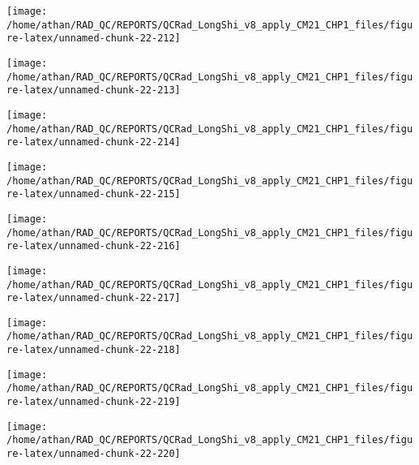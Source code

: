 \documentclass[
  10pt,
  a4paper,oneside]{article}
\begin{document}
\begin{center}\texttt{[image: /home/athan/RAD\_QC/REPORTS/QCRad\_LongShi\_v8\_apply\_CM21\_CHP1\_files/figure-latex/unnamed-chunk-22-212]} \end{center}

\begin{center}\texttt{[image: /home/athan/RAD\_QC/REPORTS/QCRad\_LongShi\_v8\_apply\_CM21\_CHP1\_files/figure-latex/unnamed-chunk-22-213]} \end{center}

\begin{center}\texttt{[image: /home/athan/RAD\_QC/REPORTS/QCRad\_LongShi\_v8\_apply\_CM21\_CHP1\_files/figure-latex/unnamed-chunk-22-214]} \end{center}

\begin{center}\texttt{[image: /home/athan/RAD\_QC/REPORTS/QCRad\_LongShi\_v8\_apply\_CM21\_CHP1\_files/figure-latex/unnamed-chunk-22-215]} \end{center}

\begin{center}\texttt{[image: /home/athan/RAD\_QC/REPORTS/QCRad\_LongShi\_v8\_apply\_CM21\_CHP1\_files/figure-latex/unnamed-chunk-22-216]} \end{center}

\begin{center}\texttt{[image: /home/athan/RAD\_QC/REPORTS/QCRad\_LongShi\_v8\_apply\_CM21\_CHP1\_files/figure-latex/unnamed-chunk-22-217]} \end{center}

\begin{center}\texttt{[image: /home/athan/RAD\_QC/REPORTS/QCRad\_LongShi\_v8\_apply\_CM21\_CHP1\_files/figure-latex/unnamed-chunk-22-218]} \end{center}

\begin{center}\texttt{[image: /home/athan/RAD\_QC/REPORTS/QCRad\_LongShi\_v8\_apply\_CM21\_CHP1\_files/figure-latex/unnamed-chunk-22-219]} \end{center}

\begin{center}\texttt{[image: /home/athan/RAD\_QC/REPORTS/QCRad\_LongShi\_v8\_apply\_CM21\_CHP1\_files/figure-latex/unnamed-chunk-22-220]} \end{center}
\end{document}
